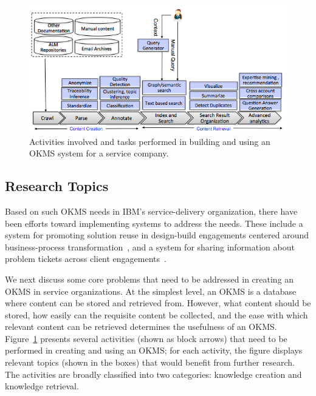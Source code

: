 \begin{figure}[t]
	\center
	\includegraphics[width=\columnwidth]{figs/km.png}
        \vspace*{-18pt}
	\caption{Activities involved and tasks performed in building and using
          an OKMS system for a service company.}
        \vspace*{-10pt}
	\label{fig-km}
\end{figure}

\subsection{Research Topics}

Based on such OKMS needs in IBM's service-delivery organization, there have been
efforts toward implementing systems to address the needs. These include a system
for promoting solution reuse in design-build engagements centered around
business-process transformation~\cite{Goodwin:2012b}, and a system for sharing
information about problem tickets across client
engagements~\cite{Majumdar:2011}.

We next discuss some core problems that need to be addressed in creating an OKMS
in service organizations. At the simplest level, an OKMS is a database where
content can be stored and retrieved from. However, what content should be
stored, how easily can the requisite content be collected, and the ease with which relevant
content can be retrieved determines the usefulness of an OKMS.
Figure~\ref{fig-km} presents several activities (shown as block arrows) that
need to be performed in creating and using an OKMS; for each activity, the
figure displays relevant topics (shown in the boxes) that would benefit from
further research. The activities are broadly classified into two categories:
knowledge creation and knowledge retrieval.




